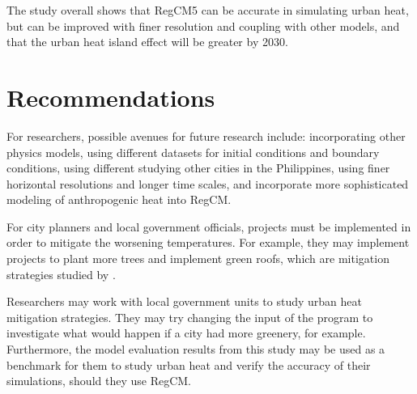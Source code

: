 The study overall shows that RegCM5 can be accurate in simulating urban heat, but can be improved with finer resolution and coupling with other models, and that 
the urban heat island effect will be greater by 2030.
	
\section{Recommendations}
	For researchers, possible avenues for future research include:
	incorporating other physics models, using different datasets for initial conditions and boundary conditions, using different studying other cities in the Philippines, using finer horizontal resolutions and longer time scales, and incorporate more sophisticated modeling of anthropogenic heat into RegCM.
	
	For city planners and local government officials, projects must be implemented in order to mitigate the worsening temperatures.
	For example, they may implement projects to plant more trees and implement green roofs, which are mitigation strategies studied by \textcite{Cortes2022}.
	
	Researchers may work with local government units to study urban heat mitigation strategies. They may try changing the input of the program to investigate what would happen if a city had more greenery, for example.
	Furthermore, the model evaluation results from this study may be used as a benchmark for them to study urban heat and verify the accuracy of their simulations, should they use RegCM.